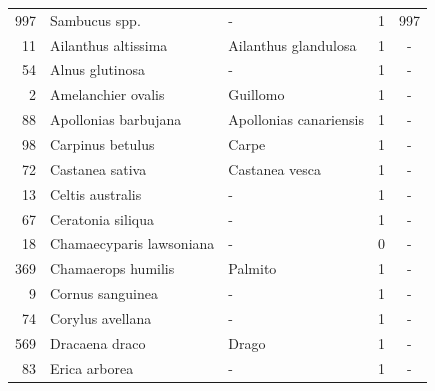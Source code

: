 \begin{longtable}{r p{4cm} p{5cm} c c}
    997           & Sambucus spp.                     & -                                             & 1             & 997            \\
    11            & Ailanthus altissima               & Ailanthus glandulosa                          & 1             & -              \\
    54            & Alnus glutinosa                   & -                                             & 1             & -              \\
    2             & Amelanchier ovalis                & Guillomo                                      & 1             & -              \\
    88            & Apollonias barbujana              & Apollonias canariensis                        & 1             & -              \\
    98            & Carpinus betulus                  & Carpe                                         & 1             & -              \\
    72            & Castanea sativa                   & Castanea vesca                                & 1             & -              \\
    13            & Celtis australis                  & -                                             & 1             & -              \\
    67            & Ceratonia siliqua                 & -                                             & 1             & -              \\
    18            & Chamaecyparis lawsoniana          & -                                             & 0             & -              \\
    369           & Chamaerops humilis                & Palmito                                       & 1             & -              \\
    9             & Cornus sanguinea                  & -                                             & 1             & -              \\
    74            & Corylus avellana                  & -                                             & 1             & -              \\
    569           & Dracaena draco                    & Drago                                         & 1             & -              \\
    83            & Erica arborea                     & -                                             & 1             & -              \\

\end{longtable}
